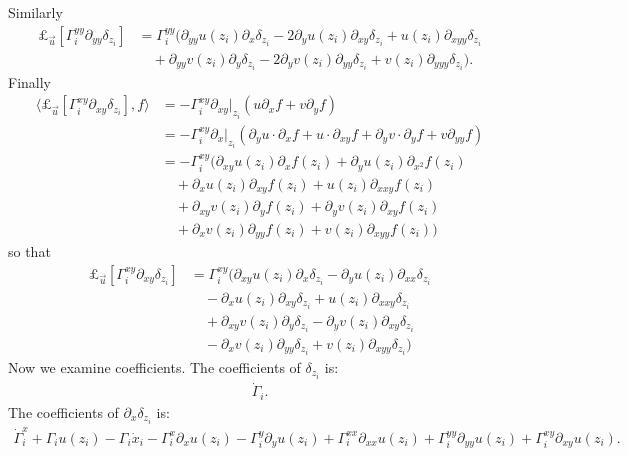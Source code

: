 \documentclass[12pt]{amsart}
\begin{document}
Similarly
\begin{align*}
	\pounds_{\vec{u}}[ \Gamma_i^{yy} \partial_{yy}\delta_{z_i}] &=
		\Gamma_i^{yy} \Big( \partial_{yy}u(z_i) \partial_x \delta_{z_i} - 2 \partial_yu(z_i) \partial_{xy} \delta_{z_i} + u(z_i) \partial_{xyy} \delta_{z_i} \\
		& \quad + \partial_{yy}v(z_i) \partial_y \delta_{z_i} - 2 \partial_yv(z_i) \partial_{yy}\delta_{z_i} + v(z_i) \partial_{yyy} \delta_{z_i} \Big).
\end{align*}
Finally
\begin{align*}
	\langle \pounds_{\vec{u}}[ \Gamma_i^{xy} \partial_{xy} \delta_{z_i}] , f \rangle &= - \Gamma_i^{xy} \partial_{xy}|_{z_i}( u \partial_x f + v \partial_y f ) \\
	&= -\Gamma_i^{xy} \partial_x|_{z_i} ( \partial_y u \cdot \partial_x f + u \cdot \partial_{xy}f + \partial_yv \cdot \partial_yf + v \partial_{yy}f) \\
	&= - \Gamma_i^{xy} \Big( \partial_{xy}u(z_i) \partial_xf(z_i) + \partial_y u(z_i) \partial_{x^2}f(z_i) \\
		&\quad + \partial_x u(z_i) \partial_{xy}f(z_i) + u(z_i) \partial_{xxy}f(z_i) \\
		&\quad + \partial_{xy} v (z_i) \partial_y f(z_i) + \partial_yv(z_i) \partial_{xy}f(z_i) \\
		&\quad + \partial_xv(z_i) \partial_{yy}f(z_i) + v(z_i) \partial_{xyy}f(z_i) \Big)
\end{align*}
so that
\begin{align*}
	\pounds_{\vec{u}}[ \Gamma_i^{xy} \partial_{xy} \delta_{z_i} ] &= \Gamma_i^{xy} \Big( \partial_{xy}u(z_i) \partial_x \delta_{z_i} - \partial_y u(z_i) \partial_{xx}\delta_{z_i} \\
		&\quad - \partial_x u(z_i) \partial_{xy} \delta_{z_i} + u(z_i) \partial_{xxy}\delta_{z_i} \\
		&\quad + \partial_{xy} v (z_i) \partial_y \delta_{z_i} - \partial_yv(z_i) \partial_{xy}\delta_{z_i} \\
		&\quad - \partial_xv(z_i) \partial_{yy}\delta_{z_i} + v(z_i) \partial_{xyy}\delta_{z_i} \Big)
\end{align*}
Now we examine coefficients.
The coefficients of $\delta_{z_i}$ is:
\begin{align*}
	\dot{\Gamma}_i.
\end{align*}
The coefficients of $\partial_{x}\delta_{z_i}$ is:
\begin{align*}
	\dot{\Gamma}_i^x +\Gamma_i u(z_i)-\Gamma_i \dot{x}_i - \Gamma_i^x \partial_xu(z_i) - \Gamma_i^y \partial_y u(z_i) + \Gamma_i^{xx} \partial_{xx} u(z_i) + \Gamma_i^{yy} \partial_{yy}u(z_i) + \Gamma_i^{xy} \partial_{xy} u(z_i).
\end{align*}
\end{document}
